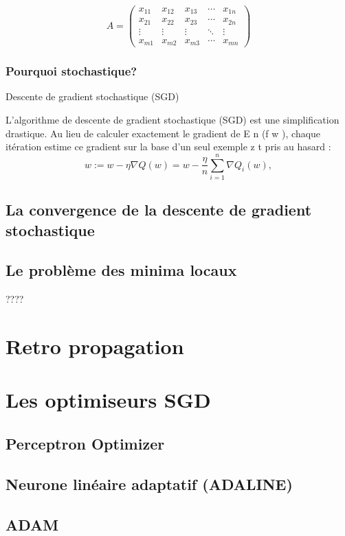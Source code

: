 	\lipsum[1] \\ 
	
	$$A = \begin{pmatrix}
		x_{11} & x_{12} & x_{13} & \cdots & x_{1n} \\
		x_{21} & x_{22} & x_{23} & \cdots & x_{2n} \\
		\vdots & \vdots & \vdots & \ddots & \vdots \\
		x_{m1} & x_{m2} & x_{m3} & \cdots & x_{mn} 
	\end{pmatrix}$$
	
	
	\lipsum[4]
	\subsubsection{Pourquoi stochastique?}
	Descente de gradient stochastique (SGD) 
	
	L'algorithme de descente de gradient stochastique (SGD) est une simplification drastique. Au lieu de calculer exactement le gradient de E n (f w ), chaque itération estime ce gradient sur la base d'un seul exemple z t pris au hasard \cite{bottou2012stochastic} :
	$$
	{\displaystyle w:=w-\eta \nabla Q(w)=w-{\frac {\eta }{n}}\sum _{i=1}^{n}\nabla Q_{i}(w),}
	$$
	\lipsum[1]	
	\subsection{La convergence de la descente de gradient stochastique}
	\lipsum[1]
	\subsection{Le problème des minima locaux} \cite[page 291][]{antoine2018apprentissage}????
	
	
	\section{Retro propagation}
	
	
	\section{Les optimiseurs SGD}
	\subsection{Perceptron Optimizer}
	
	
	
	\subsection{Neurone linéaire adaptatif (ADALINE)}
	\lipsum[1]
	
	\subsection{ADAM}

